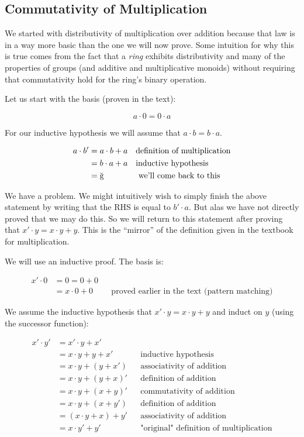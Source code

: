 \documentclass{article}
\begin{document}
\subsection*{Commutativity of Multiplication}

We started with distributivity of multiplication over addition because that law is in a way more basic than the one we will now prove. Some intuition for why this is true comes from the fact that a \textit{ring} exhibits distributivity and many of the properties of groups (and additive and multiplicative monoids) without requiring that commutativity hold for the ring's binary operation.

Let us start with the basis (proven in the text):

$$a \cdot 0 = 0 \cdot a $$

For our inductive hypothesis we will assume that $a \cdot b = b \cdot a$.

\begin{align*}
a \cdot b' &= a \cdot b + a && \text{definition of multiplication} \\
&= b \cdot a + a && \text{inductive hypothesis} \\
&= \Frowny{} && \text{ we'll come back to this}
\end{align*}

We have a problem. We might intuitively wish to simply finish the above statement by writing that the RHS is equal to $b' \cdot a$. But alas we have not directly proved that we may do this. So we will return to this statement after proving that $x' \cdot y = x \cdot y + y$. This is the ``mirror'' of the definition given in the textbook for multiplication.

We will use an inductive proof. The basis is:

\begin{align*}
x' \cdot 0 &= 0 = 0 + 0 \\
&= x \cdot 0 + 0 && \text{proved earlier in the text (pattern matching)}
\end{align*}

We assume the inductive hypothesis that $x' \cdot y = x \cdot y + y$ and induct on $y$ (using the successor function):

\begin{align*}
x' \cdot y' &= x' \cdot y + x' \\
&= x \cdot y + y + x' && \text{inductive hypothesis} \\
&= x \cdot y + (y + x') && \text{associativity of addition} \\
&= x \cdot y + (y + x)' && \text{definition of addition} \\
&= x \cdot y + (x + y)' && \text{commutativity of addition} \\
&= x \cdot y + (x + y') && \text{definition of addition} \\
&= (x \cdot y + x) + y' && \text{associativity of addition} \\
&= x \cdot y' + y' && \text{"original" definition of multiplication} \\
\end{align*}
\end{document}
